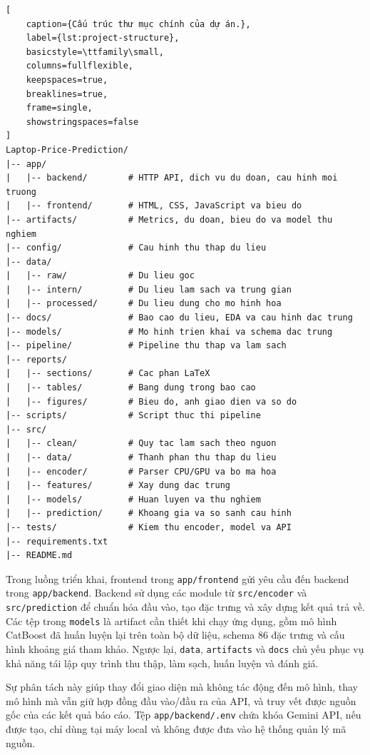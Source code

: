 \begin{lstlisting}[
    caption={Cấu trúc thư mục chính của dự án.},
    label={lst:project-structure},
    basicstyle=\ttfamily\small,
    columns=fullflexible,
    keepspaces=true,
    breaklines=true,
    frame=single,
    showstringspaces=false
]
Laptop-Price-Prediction/
|-- app/
|   |-- backend/        # HTTP API, dich vu du doan, cau hinh moi truong
|   |-- frontend/       # HTML, CSS, JavaScript va bieu do
|-- artifacts/          # Metrics, du doan, bieu do va model thu nghiem
|-- config/             # Cau hinh thu thap du lieu
|-- data/
|   |-- raw/            # Du lieu goc
|   |-- intern/         # Du lieu lam sach va trung gian
|   |-- processed/      # Du lieu dung cho mo hinh hoa
|-- docs/               # Bao cao du lieu, EDA va cau hinh dac trung
|-- models/             # Mo hinh trien khai va schema dac trung
|-- pipeline/           # Pipeline thu thap va lam sach
|-- reports/
|   |-- sections/       # Cac phan LaTeX
|   |-- tables/         # Bang dung trong bao cao
|   |-- figures/        # Bieu do, anh giao dien va so do
|-- scripts/            # Script thuc thi pipeline
|-- src/
|   |-- clean/          # Quy tac lam sach theo nguon
|   |-- data/           # Thanh phan thu thap du lieu
|   |-- encoder/        # Parser CPU/GPU va bo ma hoa
|   |-- features/       # Xay dung dac trung
|   |-- models/         # Huan luyen va thu nghiem
|   |-- prediction/     # Khoang gia va so sanh cau hinh
|-- tests/              # Kiem thu encoder, model va API
|-- requirements.txt
|-- README.md
\end{lstlisting}

Trong luồng triển khai, frontend trong \texttt{app/frontend} gửi yêu cầu đến backend trong \texttt{app/backend}. Backend sử dụng các module từ \texttt{src/encoder} và \texttt{src/prediction} để chuẩn hóa đầu vào, tạo đặc trưng và xây dựng kết quả trả về. Các tệp trong \texttt{models} là artifact cần thiết khi chạy ứng dụng, gồm mô hình CatBoost đã huấn luyện lại trên toàn bộ dữ liệu, schema 86 đặc trưng và cấu hình khoảng giá tham khảo. Ngược lại, \texttt{data}, \texttt{artifacts} và \texttt{docs} chủ yếu phục vụ khả năng tái lập quy trình thu thập, làm sạch, huấn luyện và đánh giá.

Sự phân tách này giúp thay đổi giao diện mà không tác động đến mô hình, thay mô hình mà vẫn giữ hợp đồng đầu vào/đầu ra của API, và truy vết được nguồn gốc của các kết quả báo cáo. Tệp \texttt{app/backend/.env} chứa khóa Gemini API, nếu được tạo, chỉ dùng tại máy local và không được đưa vào hệ thống quản lý mã nguồn.

